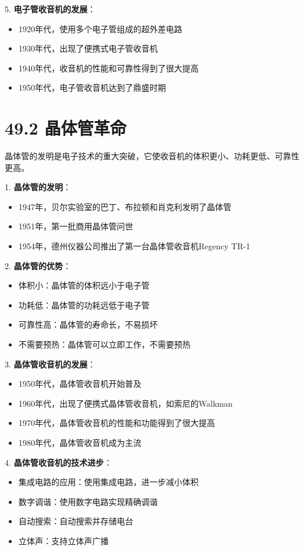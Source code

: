 \documentclass[12pt,UTF8]{ctexbook}
\begin{document}
5. \textbf{电子管收音机的发展}：
   \begin{itemize}[leftmargin=3.5em]
   \item 1920年代，使用多个电子管组成的超外差电路
   \item 1930年代，出现了便携式电子管收音机
   \item 1940年代，收音机的性能和可靠性得到了很大提高
   \item 1950年代，电子管收音机达到了鼎盛时期
   \end{itemize}

\section*{49.2 晶体管革命}

晶体管的发明是电子技术的重大突破，它使收音机的体积更小、功耗更低、可靠性更高。

1. \textbf{晶体管的发明}：
   \begin{itemize}[leftmargin=3.5em]
   \item 1947年，贝尔实验室的巴丁、布拉顿和肖克利发明了晶体管
   \item 1951年，第一批商用晶体管问世
   \item 1954年，德州仪器公司推出了第一台晶体管收音机Regency TR-1
   \end{itemize}

2. \textbf{晶体管的优势}：
   \begin{itemize}[leftmargin=3.5em]
   \item 体积小：晶体管的体积远小于电子管
   \item 功耗低：晶体管的功耗远低于电子管
   \item 可靠性高：晶体管的寿命长，不易损坏
   \item 不需要预热：晶体管可以立即工作，不需要预热
   \end{itemize}

3. \textbf{晶体管收音机的发展}：
   \begin{itemize}[leftmargin=3.5em]
   \item 1950年代，晶体管收音机开始普及
   \item 1960年代，出现了便携式晶体管收音机，如索尼的Walkman
   \item 1970年代，晶体管收音机的性能和功能得到了很大提高
   \item 1980年代，晶体管收音机成为主流
   \end{itemize}

4. \textbf{晶体管收音机的技术进步}：
   \begin{itemize}[leftmargin=3.5em]
   \item 集成电路的应用：使用集成电路，进一步减小体积
   \item 数字调谐：使用数字电路实现精确调谐
   \item 自动搜索：自动搜索并存储电台
   \item 立体声：支持立体声广播
   \end{itemize}
\end{document}
